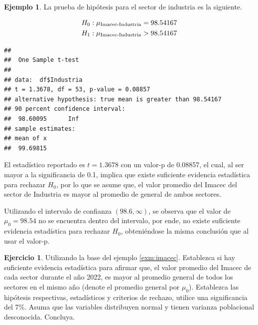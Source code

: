 \documentclass[
]{book}
\newenvironment{Shaded}{\begin{snugshade}}{\end{snugshade}}
\newcommand{\AttributeTok}[1]{\textcolor[rgb]{0.77,0.63,0.00}{#1}}
\newcommand{\CommentTok}[1]{\textcolor[rgb]{0.56,0.35,0.01}{\textit{#1}}}
\newcommand{\FloatTok}[1]{\textcolor[rgb]{0.00,0.00,0.81}{#1}}
\newcommand{\FunctionTok}[1]{\textcolor[rgb]{0.00,0.00,0.00}{#1}}
\newcommand{\NormalTok}[1]{#1}
\newcommand{\SpecialCharTok}[1]{\textcolor[rgb]{0.00,0.00,0.00}{#1}}
\newcommand{\StringTok}[1]{\textcolor[rgb]{0.31,0.60,0.02}{#1}}
\theoremstyle{definition}
\theoremstyle{definition}
\newtheorem{example}{Ejemplo}[chapter]
\theoremstyle{definition}
\newtheorem{exercise}{Ejercicio}[chapter]
\theoremstyle{definition}
\theoremstyle{remark}
\begin{document}
\begin{example}
La prueba de hipótesis para el sector de industria es la siguiente.

\begin{equation}
    \notag
    \begin{split}
        H_0: \mu_{\text{Imacec-Industria}} = 98.54167\\
        H_1: \mu_{\text{Imacec-Industria}} > 98.54167
    \end{split}
\end{equation}

\begin{Shaded}
\end{Shaded}

\begin{verbatim}
## 
##  One Sample t-test
## 
## data:  df$Industria
## t = 1.3678, df = 53, p-value = 0.08857
## alternative hypothesis: true mean is greater than 98.54167
## 90 percent confidence interval:
##  98.60095      Inf
## sample estimates:
## mean of x 
##  99.69815
\end{verbatim}

El estadístico reportado es \(t = 1.3678\) con un valor-p de 0.08857, el cual, al ser mayor a la significancia de 0.1, implica que existe suficiente evidencia estadística para rechazar \(H_0\), por lo que se asume que, el valor promedio del Imacec del sector de Industria es mayor al promedio de general de ambos sectores.

Utilizando el intervalo de confianza \((98.6, \infty)\), se observa que el valor de \(\mu_0 = 98.54\) no se encuentra dentro del intervalo, por ende, no existe suficiente evidencia estadística para rechazar \(H_0\), obteniéndose la misma conclusión que al usar el valor-p.
\end{example}

\begin{exercise}
Utilizando la base del ejemplo \ref{exm:imacec}. Establezca si hay suficiente evidencia estadística para afirmar que, el valor promedio del Imacec de cada sector durante el año 2022, es mayor al promedio general de todos los sectores en el mismo año (denote el promedio general por \(\mu_{0}\)). Establezca las hipótesis respectivas, estadísticos y criterios de rechazo, utilice una significancia del 7\%. Asuma que las variables distribuyen normal y tienen varianza poblacional desconocida. Concluya.
\end{exercise}
\end{document}
